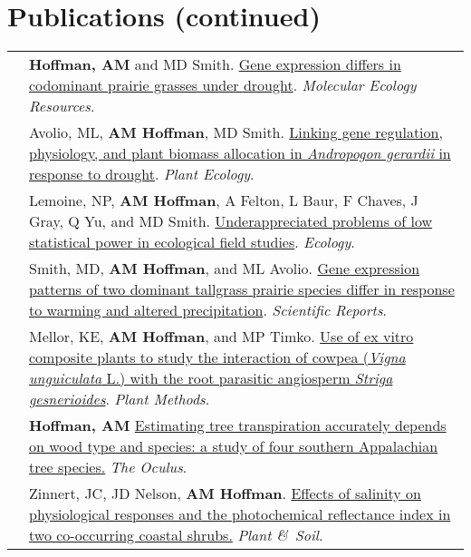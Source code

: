 \documentclass[letterpaper]{deedy-resume} %
\begin{document}
\section{Publications (continued)}
\begin{tabular}{>{\raggedleft\arraybackslash}p{2cm}p{16cm}}

2017 & \textbf{Hoffman, AM} and MD Smith. \href{http://onlinelibrary.wiley.com/doi/10.1111/1755-0998.12733/full}{Gene expression differs in codominant prairie grasses under drought}. \textcolor{special}{\textit{Molecular Ecology Resources}}.\\

2017 & Avolio, ML, \textbf{AM Hoffman}, MD Smith. \href{https://link.springer.com/article/10.1007/s11258-017-0773-3}{Linking gene regulation, physiology, and plant biomass allocation in \textit{Andropogon gerardii} in response to drought}. \textcolor{special}{\textit{Plant Ecology}}. \\

2016 & Lemoine, NP, \textbf{AM Hoffman}, A Felton, L Baur, F Chaves, J Gray, Q Yu, and MD Smith. \href{http://onlinelibrary.wiley.com/doi/10.1002/ecy.1506/full}{Underappreciated problems of low statistical power in ecological field studies}. \textcolor{special}{\textit{Ecology}}. \\

2016 & Smith, MD, \textbf{AM Hoffman}, and ML Avolio. \href{http://www.nature.com/articles/srep25522}{Gene expression patterns of two dominant tallgrass prairie species differ in response to warming and altered precipitation}. \textcolor{special}{\textit{Scientific Reports}}.\\

2012 & Mellor, KE, \textbf{AM Hoffman}, and MP Timko. \href{http://www.plantmethods.com/content/pdf/1746-4811-8-22.pdf}{Use of ex vitro composite plants to study the interaction of cowpea (\textit{Vigna unguiculata} L.) with the root parasitic angiosperm \textit{Striga gesnerioides}}. \textcolor{special}{\textit{Plant Methods}}. \\

2012 & \textbf{Hoffman, AM} \href{http://issuu.com/theoculus/docs/spring2012/}{Estimating tree transpiration accurately depends on wood type and species: a study of four southern Appalachian tree species.} \textcolor{special}{\textit{The Oculus}}.\\

2011 & Zinnert, JC, JD Nelson, \textbf{AM Hoffman}. \href{http://link.springer.com/article/10.1007\%2Fs11104-011-0955-z}{Effects of salinity on physiological responses and the photochemical reflectance index in two co-occurring coastal shrubs.} \textcolor{special}{\textit{Plant \&\ Soil}}. \\


\end{tabular}
\end{document}
